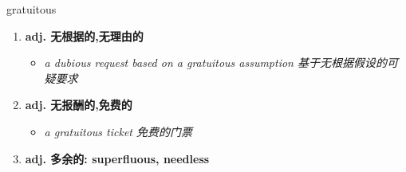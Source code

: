 
\begin{frame}
{\huge gratuitous}
\begin{center}
\begin{enumerate}\Large
  \item \textbf{adj. 无根据的,无理由的}
  \begin{itemize}
    \item \em{\Large{a dubious request based on a gratuitous assumption 基于无根据假设的可疑要求}}
  \end{itemize}
  \item \textbf{adj. 无报酬的,免费的}
  \begin{itemize}
    \item \em{\Large{a gratuitous ticket 免费的门票}}
  \end{itemize}
  \item \textbf{adj. 多余的: superfluous, needless}
\end{enumerate}
\end{center}
\end{frame}
